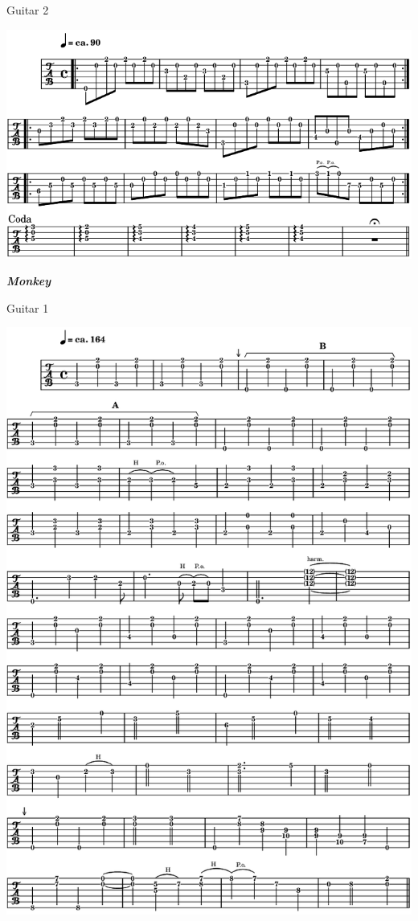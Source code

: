 \bigskip

 \quad Guitar 2

\begin{center}
\includegraphics[width=\textwidth]{img/neE2}
\end{center}

\newpage

\textbf{\textsl{Monkey}}  

\smallskip

 \quad Guitar 1

\begin{center}
\includegraphics[width=\textwidth]{img/neD1}
\end{center}

